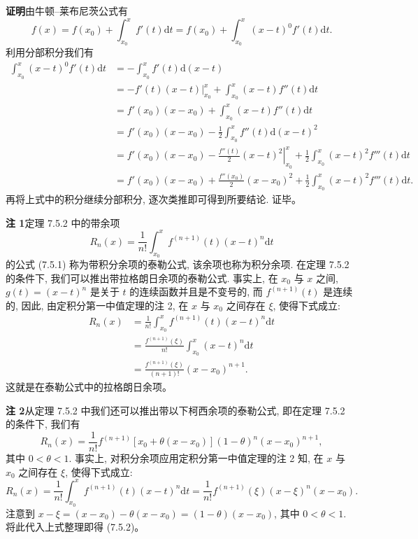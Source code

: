 \documentclass[UTF8,12pt,a4paper,fontset=fandol]{ctexart}
\begin{document}
\noindent\textbf{证明}\quad 由牛顿--莱布尼茨公式有
\[
  f(x)=f(x_0)+\int_{x_0}^x f'(t)\mathrm dt
  =f(x_0)+\int_{x_0}^x (x-t)^0f'(t)\mathrm dt.
\]
利用分部积分我们有
\[
\begin{aligned}
  \int_{x_0}^x (x-t)^0f'(t)\mathrm dt
  &=-\int_{x_0}^x f'(t)\mathrm d(x-t)\\
  &=-\left.f'(t)(x-t)\right|_{x_0}^x+\int_{x_0}^x (x-t)f''(t)\mathrm dt\\
  &=f'(x_0)(x-x_0)+\int_{x_0}^x (x-t)f''(t)\mathrm dt\\
  &=f'(x_0)(x-x_0)-\frac{1}{2}\int_{x_0}^x f''(t)\mathrm d(x-t)^2\\
  &=f'(x_0)(x-x_0)-\left.\frac{f''(t)}{2}(x-t)^2\right|_{x_0}^x
  +\frac{1}{2}\int_{x_0}^x (x-t)^2f'''(t)\mathrm dt\\
  &=f'(x_0)(x-x_0)+\frac{f''(x_0)}{2}(x-x_0)^2
  +\frac{1}{2}\int_{x_0}^x (x-t)^2f'''(t)\mathrm dt.
\end{aligned}
\]
再将上式中的积分继续分部积分, 逐次类推即可得到所要结论. 证毕。

\noindent\textbf{注 1}\quad 定理 7.5.2 中的带余项
\[
  R_n(x)=\frac{1}{n!}\int_{x_0}^x f^{(n+1)}(t)(x-t)^n\mathrm dt
\]
的公式 (7.5.1) 称为带积分余项的泰勒公式, 该余项也称为积分余项. 在定理 7.5.2 的条件下, 我们可以推出带拉格朗日余项的泰勒公式. 事实上, 在 $x_0$ 与 $x$ 之间, $g(t)=(x-t)^n$ 是关于 $t$ 的连续函数并且是不变号的, 而 $f^{(n+1)}(t)$ 是连续的, 因此, 由定积分第一中值定理的注 2, 在 $x$ 与 $x_0$ 之间存在 $\xi$, 使得下式成立:
\[
\begin{aligned}
  R_n(x)&=\frac{1}{n!}\int_{x_0}^x f^{(n+1)}(t)(x-t)^n\mathrm dt\\
  &=\frac{f^{(n+1)}(\xi)}{n!}\int_{x_0}^x (x-t)^n\mathrm dt\\
  &=\frac{f^{(n+1)}(\xi)}{(n+1)!}(x-x_0)^{n+1}.
\end{aligned}
\]
这就是在泰勒公式中的拉格朗日余项。

\noindent\textbf{注 2}\quad 从定理 7.5.2 中我们还可以推出带以下柯西余项的泰勒公式, 即在定理 7.5.2 的条件下, 我们有
\begin{equation}
  R_n(x)=\frac{1}{n!}f^{(n+1)}[x_0+\theta(x-x_0)](1-\theta)^n(x-x_0)^{n+1},
  \tag{7.5.2}
\end{equation}
其中 $0<\theta<1$. 事实上, 对积分余项应用定积分第一中值定理的注 2 知, 在 $x$ 与 $x_0$ 之间存在 $\xi$, 使得下式成立:
\[
  R_n(x)=\frac{1}{n!}\int_{x_0}^x f^{(n+1)}(t)(x-t)^n\mathrm dt
  =\frac{1}{n!}f^{(n+1)}(\xi)(x-\xi)^n(x-x_0).
\]
注意到 $x-\xi=(x-x_0)-\theta(x-x_0)=(1-\theta)(x-x_0)$, 其中 $0<\theta<1$. 将此代入上式整理即得 (7.5.2)。
\end{document}
